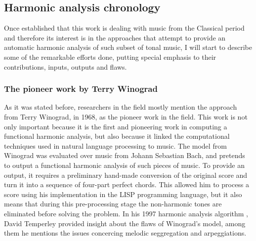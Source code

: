   \subsection{Harmonic analysis chronology}
  Once established that this work is dealing with music from the Classical period and therefore its interest is in the approaches that attempt to provide an automatic harmonic analysis of such subset of tonal music, I will start to describe some of the remarkable efforts done, putting special emphasis to their contributions, inputs, outputs and flaws.
    \subsubsection{The pioneer work by Terry Winograd}
    As it was stated before, researchers in the field mostly mention the approach from Terry Winograd, in 1968, as the pioneer work in the field. This work is not only important because it is the first and pioneering work in computing a functional harmonic analysis, but also because it linked the computational techniques used in natural language processing to music. The model from Winograd was evaluated over music from Johann Sebastian Bach, and pretends to output a functional harmonic analysis of such pieces of music. To provide an output, it requires a preliminary hand-made conversion of the original score and turn it into a sequence of four-part perfect chords. This allowed him to process a score using his implementation in the LISP programming language, but it also means that during this pre-processing stage the non-harmonic tones are eliminated before solving the problem. In his 1997 harmonic analysis algorithm \cite{temperley1997algorithm}, David Temperley provided insight about the flaws of Winograd's model, among them he mentions the issues concercing melodic seggregation and arpeggiations.
